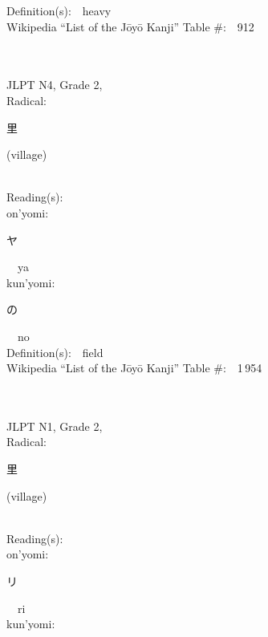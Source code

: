 \begin{multicols}{2}
Definition(s):\ \ heavy \\
Wikipedia ``List of the J\=oy\=o Kanji'' Table \#:\ \ 912 \\
\ \ \\
{\fontsize{34pt}{40pt}  }\ \ \\  %
{JLPT N4, Grade 2, \\Radical:\ \ {\begin{CJK}{UTF8}{min} 里 \end{CJK}} (village) } \\
Reading(s):\ \ \\
{\hspace*{1em}}on'yomi:\ \ \\
{\hspace*{2em}}{\begin{CJK}{UTF8}{min} ヤ \end{CJK}}\ \ ya\ \ \\
{\hspace*{1em}}kun'yomi:\ \ \\
{\hspace*{2em}}{\begin{CJK}{UTF8}{min} の \end{CJK}}\ \ no\ \ \\
Definition(s):\ \ field \\
Wikipedia ``List of the J\=oy\=o Kanji'' Table \#:\ \ 1\,954 \\
\ \ \\
{\fontsize{34pt}{40pt}  }\ \ \\  %
{JLPT N1, Grade 2, \\Radical:\ \ {\begin{CJK}{UTF8}{min} 里 \end{CJK}} (village) } \\
Reading(s):\ \ \\
{\hspace*{1em}}on'yomi:\ \ \\
{\hspace*{2em}}{\begin{CJK}{UTF8}{min} リ \end{CJK}}\ \ ri\ \ \\
{\hspace*{1em}}kun'yomi:\ \ \\

\end{multicols}
